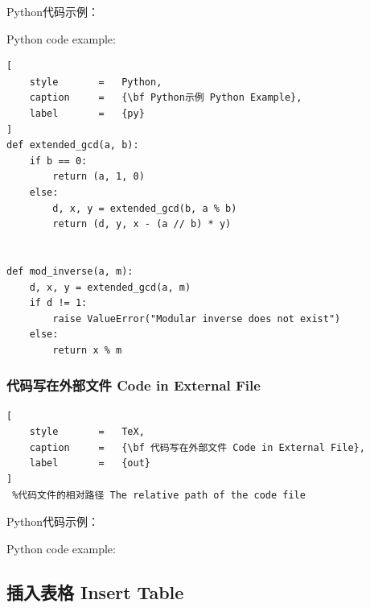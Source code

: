 \documentclass{article}
\begin{document}
\vspace{0.5cm}

Python代码示例：

Python code example:

\begin{lstlisting}[
    style       =   Python,
    caption     =   {\bf Python示例 Python Example},
    label       =   {py}
]
def extended_gcd(a, b):
    if b == 0:
        return (a, 1, 0)
    else:
        d, x, y = extended_gcd(b, a % b)
        return (d, y, x - (a // b) * y)


def mod_inverse(a, m):
    d, x, y = extended_gcd(a, m)
    if d != 1:
        raise ValueError("Modular inverse does not exist")
    else:
        return x % m
\end{lstlisting}



\subsubsection{代码写在外部文件 Code in External File}

\begin{lstlisting}[
    style       =   TeX,
    caption     =   {\bf 代码写在外部文件 Code in External File},
    label       =   {out}
]
 %代码文件的相对路径 The relative path of the code file
\end{lstlisting} 



\vspace{0.5cm}

Python代码示例：

Python code example:





\subsection{插入表格 Insert Table}
\end{document}
